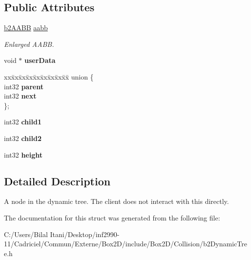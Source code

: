 \subsection*{Public Attributes}
\begin{DoxyCompactItemize}
\item 
\hyperlink{structb2_a_a_b_b}{b2\+A\+A\+BB} \hyperlink{structb2_tree_node_a798f1a594b33c713be45e76e79912239}{aabb}\hypertarget{structb2_tree_node_a798f1a594b33c713be45e76e79912239}{}\label{structb2_tree_node_a798f1a594b33c713be45e76e79912239}

\begin{DoxyCompactList}\small\item\em Enlarged A\+A\+BB. \end{DoxyCompactList}\item 
void $\ast$ {\bfseries user\+Data}\hypertarget{structb2_tree_node_aff77b3eb48326aca1b0762f5c45e56e7}{}\label{structb2_tree_node_aff77b3eb48326aca1b0762f5c45e56e7}

\item 
\begin{tabbing}
xx\=xx\=xx\=xx\=xx\=xx\=xx\=xx\=xx\=\kill
union \{\\
\>int32 {\bfseries parent}\\
\>int32 {\bfseries next}\\
\}; \hypertarget{structb2_tree_node_a9d8975d1e109fb59c7f549f1da7d75c4}{}\label{structb2_tree_node_a9d8975d1e109fb59c7f549f1da7d75c4}
\\

\end{tabbing}\item 
int32 {\bfseries child1}\hypertarget{structb2_tree_node_a3a320f2afc7d223e92ee3629602be5ca}{}\label{structb2_tree_node_a3a320f2afc7d223e92ee3629602be5ca}

\item 
int32 {\bfseries child2}\hypertarget{structb2_tree_node_aa6774ce329715b20d8b7cc8b6e3d50bc}{}\label{structb2_tree_node_aa6774ce329715b20d8b7cc8b6e3d50bc}

\item 
int32 {\bfseries height}\hypertarget{structb2_tree_node_acd183ac94a8d44195c787111be4c22e2}{}\label{structb2_tree_node_acd183ac94a8d44195c787111be4c22e2}

\end{DoxyCompactItemize}


\subsection{Detailed Description}
A node in the dynamic tree. The client does not interact with this directly. 

The documentation for this struct was generated from the following file\+:\begin{DoxyCompactItemize}
\item 
C\+:/\+Users/\+Bilal Itani/\+Desktop/inf2990-\/11/\+Cadriciel/\+Commun/\+Externe/\+Box2\+D/include/\+Box2\+D/\+Collision/b2\+Dynamic\+Tree.\+h\end{DoxyCompactItemize}

